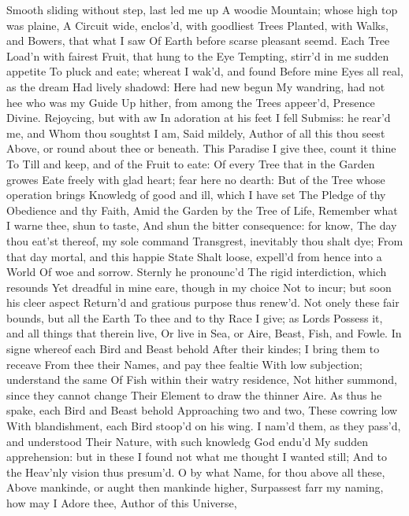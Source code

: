 \documentclass[11pt]{book}
\newcounter {last}
\begin{document}
Smooth sliding without step, last led me up 
A woodie Mountain; whose high top was plaine, 
A Circuit wide, enclos'd, with goodliest Trees 
Planted, with Walks, and Bowers, that what I saw 
Of Earth before scarse pleasant seemd.  Each Tree 
Load'n with fairest Fruit, that hung to the Eye 
Tempting, stirr'd in me sudden appetite 
To pluck and eate; whereat I wak'd, and found 
Before mine Eyes all real, as the dream 
Had lively shadowd: Here had new begun 
My wandring, had not hee who was my Guide 
Up hither, from among the Trees appeer'd, 
Presence Divine.  Rejoycing, but with aw 
In adoration at his feet I fell 
Submiss: he rear'd me, and Whom thou soughtst I am, 
Said mildely, Author of all this thou seest 
Above, or round about thee or beneath. 
This Paradise I give thee, count it thine 
To Till and keep, and of the Fruit to eate: 
Of every Tree that in the Garden growes 
Eate freely with glad heart; fear here no dearth: 
But of the Tree whose operation brings 
Knowledg of good and ill, which I have set 
The Pledge of thy Obedience and thy Faith, 
Amid the Garden by the Tree of Life, 
Remember what I warne thee, shun to taste, 
And shun the bitter consequence: for know, 
The day thou eat'st thereof, my sole command 
Transgrest, inevitably thou shalt dye; 
From that day mortal, and this happie State 
Shalt loose, expell'd from hence into a World 
Of woe and sorrow.  Sternly he pronounc'd 
The rigid interdiction, which resounds 
Yet dreadful in mine eare, though in my choice 
Not to incur; but soon his cleer aspect 
Return'd and gratious purpose thus renew'd. 
Not onely these fair bounds, but all the Earth 
To thee and to thy Race I give; as Lords 
Possess it, and all things that therein live, 
Or live in Sea, or Aire, Beast, Fish, and Fowle. 
In signe whereof each Bird and Beast behold 
After their kindes; I bring them to receave 
From thee their Names, and pay thee fealtie 
With low subjection; understand the same 
Of Fish within their watry residence, 
Not hither summond, since they cannot change 
Their Element to draw the thinner Aire. 
As thus he spake, each Bird and Beast behold 
Approaching two and two, These cowring low 
With blandishment, each Bird stoop'd on his wing. 
I nam'd them, as they pass'd, and understood 
Their Nature, with such knowledg God endu'd 
My sudden apprehension: but in these 
I found not what me thought I wanted still; 
And to the Heav'nly vision thus presum'd. 
\quad O by what Name, for thou above all these, 
Above mankinde, or aught then mankinde higher, 
Surpassest farr my naming, how may I 
Adore thee, Author of this Universe, 
\end{document}
